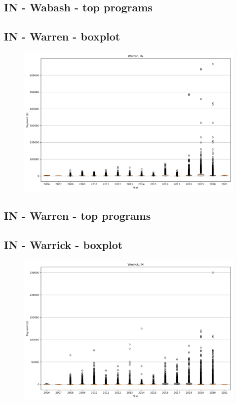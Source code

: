 \subsection*{IN - Wabash - top programs}

\newpage
\subsection*{IN - Warren - boxplot}
\begin{figure}[h]
\centering
\includegraphics[width=7in]{../output/boxplots/counties/Warren-IN_boxplot.png}
\end{figure}


\subsection*{IN - Warren - top programs}

\newpage
\subsection*{IN - Warrick - boxplot}
\begin{figure}[h]
\centering
\includegraphics[width=7in]{../output/boxplots/counties/Warrick-IN_boxplot.png}
\end{figure}


